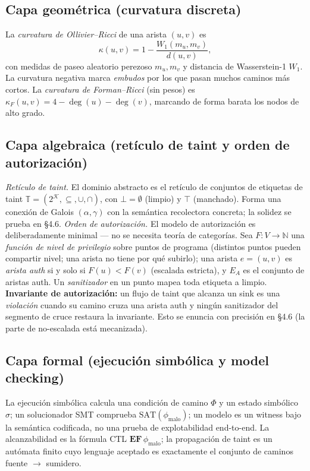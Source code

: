 \documentclass[11pt]{article}
\begin{document}
\subsection{Capa geométrica (curvatura discreta)}
La \emph{curvatura de Ollivier--Ricci} de una arista $(u,v)$ es
\[
\kappa(u,v) = 1 - \frac{W_1(m_u, m_v)}{d(u,v)},
\]
con medidas de paseo aleatorio perezoso $m_u, m_v$ y distancia de Wasserstein-1
$W_1$. La curvatura negativa marca \emph{embudos} por los que pasan muchos
caminos más cortos. La \emph{curvatura de Forman--Ricci} (sin pesos) es
$\kappa_F(u,v) = 4 - \deg(u) - \deg(v)$, marcando de forma barata los nodos de
alto grado.

\subsection{Capa algebraica (retículo de taint y orden de autorización)}
\emph{Retículo de taint.} El dominio abstracto es el retículo de conjuntos de
etiquetas de taint $\mathbb{T} = (2^{\mathcal{K}}, \subseteq, \cup, \cap)$, con
$\bot = \emptyset$ (limpio) y $\top$ (manchado). Forma una conexión de Galois
$(\alpha, \gamma)$ con la semántica recolectora concreta; la solidez se prueba en
\S4.6. \emph{Orden de autorización.} El modelo de autorización es deliberadamente
minimal --- no se necesita teoría de categorías. Sea $F : V \to \mathbb{N}$ una
\emph{función de nivel de privilegio} sobre puntos de programa (distintos puntos
pueden compartir nivel; una arista no tiene por qué subirlo); una arista $e=(u,v)$
es \emph{arista auth} si y solo si $F(u) < F(v)$ (escalada estricta), y $E_A$ es
el conjunto de aristas auth. Un \emph{sanitizador} en un punto mapea toda etiqueta
a limpio. \textbf{Invariante de autorización:} un flujo de taint que alcanza un
sink es una \emph{violación} cuando su camino cruza una arista auth y ningún
sanitizador del segmento de cruce restaura la invariante. Esto se enuncia con
precisión en \S4.6 (la parte de no-escalada está mecanizada).

\subsection{Capa formal (ejecución simbólica y model checking)}
La ejecución simbólica calcula una condición de camino $\Phi$ y un estado
simbólico $\sigma$; un solucionador SMT comprueba
$\mathrm{SAT}(\phi_{\text{malo}})$; un modelo es un witness bajo la semántica codificada, no una prueba de explotabilidad end-to-end. La
alcanzabilidad es la fórmula CTL $\mathbf{EF}\,\phi_{\text{malo}}$; la propagación de
taint es un autómata finito cuyo lenguaje aceptado es exactamente el conjunto de
caminos fuente $\to$ sumidero.
\end{document}
